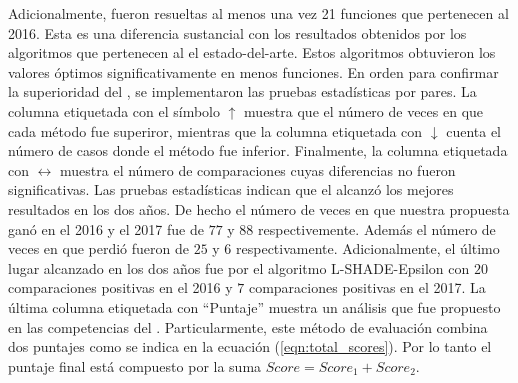 %
Adicionalmente, fueron resueltas al menos una vez 21 funciones que pertenecen al \CEC{} 2016.
%
Esta es una diferencia sustancial con los resultados obtenidos por los algoritmos que pertenecen al el estado-del-arte.
%
Estos algoritmos obtuvieron los valores óptimos significativamente en menos funciones.
%
En orden para confirmar la superioridad del \DEEDM{}, se implementaron las pruebas estadísticas por pares.
%
La columna etiquetada con el símbolo $\uparrow$ muestra que el número de veces en que cada método fue superiror, mientras que la columna etiquetada con $\downarrow$ cuenta el número de casos donde el método fue inferior.
%
Finalmente, la columna etiquetada con $\longleftrightarrow$ muestra el número de comparaciones cuyas diferencias no fueron significativas.
%
Las pruebas estadísticas indican que el \DEEDM{} alcanzó los mejores resultados en los dos años.
%
De hecho el número de veces en que nuestra propuesta ganó en el \CEC{} 2016 y el \CEC{} 2017 fue de $77$ y $88$ respectivemente.
%
Además el número de veces en que perdió fueron de $25$ y $6$ respectivamente.
%
Adicionalmente, el último lugar alcanzado en los dos años  fue por el algoritmo L-SHADE-Epsilon con $20$ comparaciones positivas en el 2016 y $7$ comparaciones positivas en el 2017.
%
%
La última columna etiquetada con ``Puntaje'' muestra un análisis que fue propuesto en las competencias del \CEC{}.
%
Particularmente, este método de evaluación combina dos puntajes como se indica en la ecuación (\ref{eqn:total_scores}).
%
%
Por lo tanto el puntaje final está compuesto por la suma $Score = Score_1 + Score_2$.

